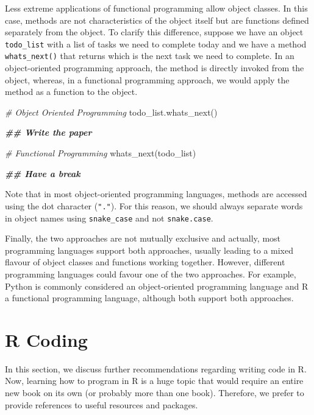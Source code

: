 \documentclass[
  11pt,
]{book}
\newenvironment{Shaded}{\begin{snugshade}}{\end{snugshade}}
\newcommand{\CommentTok}[1]{\textcolor[rgb]{0.56,0.35,0.01}{\textit{#1}}}
\newcommand{\DocumentationTok}[1]{\textcolor[rgb]{0.56,0.35,0.01}{\textbf{\textit{#1}}}}
\newcommand{\FunctionTok}[1]{\textcolor[rgb]{0.00,0.00,0.00}{#1}}
\newcommand{\NormalTok}[1]{#1}
\begin{document}
Less extreme applications of functional programming allow object classes. In this case, methods are not characteristics of the object itself but are functions defined separately from the object. To clarify this difference, suppose we have an object \texttt{todo\_list} with a list of tasks we need to complete today and we have a method \texttt{whats\_next()} that returns which is the next task we need to complete. In an object-oriented programming approach, the method is directly invoked from the object, whereas, in a functional programming approach, we would apply the method as a function to the object.

\begin{Shaded}
\begin{Highlighting}[]
\CommentTok{\# Object Oriented Programming}
\FunctionTok{todo\_list.whats\_next}\NormalTok{()}

\DocumentationTok{\#\# Write the paper}

\CommentTok{\# Functional Programming}
\FunctionTok{whats\_next}\NormalTok{(todo\_list)}

\DocumentationTok{\#\# Have a break}
\end{Highlighting}
\end{Shaded}

Note that in most object-oriented programming languages, methods are accessed using the dot character (\texttt{"."}). For this reason, we should always separate words in object names using \texttt{snake\_case} and not \texttt{snake.case}.

Finally, the two approaches are not mutually exclusive and actually, most programming languages support both approaches, usually leading to a mixed flavour of object classes and functions working together. However, different programming languages could favour one of the two approaches. For example, Python is commonly considered an object-oriented programming language and R a functional programming language, although both support both approaches.

\hypertarget{R-coding}{%
\section{R Coding}\label{R-coding}}

In this section, we discuss further recommendations regarding writing code in R. Now, learning how to program in R is a huge topic that would require an entire new book on its own (or probably more than one book). Therefore, we prefer to provide references to useful resources and packages.
\end{document}
